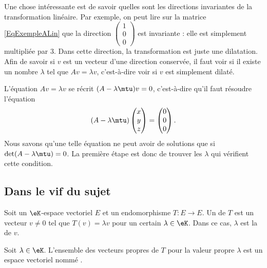Une chose intéressante est de savoir quelles sont les directions invariantes de la transformation linéaire. Par exemple, on peut lire sur la matrice \eqref{EqExempleALin} que la direction \( \begin{pmatrix}
	1 \\
	0 \\
	0
\end{pmatrix}\) est invariante : elle est simplement multipliée par \( 3\). Dans cette direction, la transformation est juste une dilatation. Afin de savoir si \( v\) est un vecteur d'une direction conservée, il faut voir si il existe un nombre \( \lambda\) tel que \( Av=\lambda v\), c'est-à-dire voir si \( v\) est simplement dilaté.

L'équation \( Av=\lambda v\) se récrit \( (A-\lambda\mtu)v=0\), c'est-à-dire qu'il faut résoudre l'équation
\begin{equation}
	(A-\lambda\mtu)\begin{pmatrix}
		x \\
		y \\
		z
	\end{pmatrix}=
	\begin{pmatrix}
		0 \\
		0 \\
		0
	\end{pmatrix}.
\end{equation}
Nous savons qu'une telle équation ne peut avoir de solutions que si \( \det(A-\lambda\mtu)=0\). La première étape est donc de trouver les \( \lambda\) qui vérifient cette condition.

\subsection{Dans le vif du sujet}

\begin{propositionDef}      \label{DefooMMKZooVcskCc}
	Soit un \( \eK\)-espace vectoriel \( E\) et un endomorphisme \( T\colon E\to E\). Un  de \( T\) est un vecteur \( v \neq 0\) tel que \( T(v)=\lambda v\) pour un certain \( \lambda\in \eK\). Dans ce cas, \( \lambda\) est la  de \( v\).

	Soit \( \lambda\in \eK\). L'ensemble des vecteurs propres de \( T\) pour la valeur propre \( \lambda\) est un espace vectoriel nommé .
\end{propositionDef}

